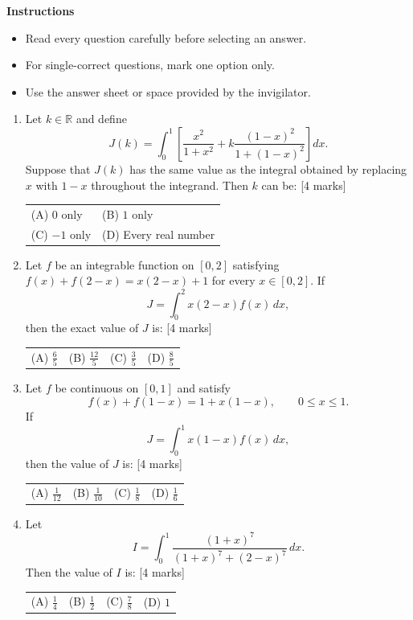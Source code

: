 \documentclass[11pt,a4paper]{article}
\begin{document}
\textbf{Instructions}
\begin{itemize}[topsep=2pt]
\item Read every question carefully before selecting an answer.
\item For single-correct questions, mark one option only.
\item Use the answer sheet or space provided by the invigilator.
\end{itemize}
\begin{enumerate}[resume]
\item Let \(k\in\mathbb{R}\) and define
\[
J(k)=\int_0^1\left[\frac{x^2}{1+x^2}+k\frac{(1-x)^2}{1+(1-x)^2}\right]dx.
\]
Suppose that \(J(k)\) has the same value as the integral obtained by replacing \(x\) with \(1-x\) throughout the integrand. Then \(k\) can be: \hfill [4 marks]
{\renewcommand{\arraystretch}{1.8}
\begin{tabularx}{\linewidth}{X X}
(A) \quad \(0\) only & (B) \quad \(1\) only \\[10pt]
(C) \quad \(-1\) only & (D) \quad Every real number \\[10pt]
\end{tabularx}}
\item Let $f$ be an integrable function on $[0,2]$ satisfying $f(x)+f(2-x)=x(2-x)+1$ for every $x\in[0,2]$. If
\[
J=\int_0^2 x(2-x)f(x)\,dx,
\]
then the exact value of $J$ is: \hfill [4 marks]
{\renewcommand{\arraystretch}{1.8}
\begin{tabularx}{\linewidth}{X X X X}
(A) \quad $\frac{6}{5}$ & (B) \quad $\frac{12}{5}$ & (C) \quad $\frac{3}{5}$ & (D) \quad $\frac{8}{5}$ \\[10pt]
\end{tabularx}}
\item Let $f$ be continuous on $[0,1]$ and satisfy
\[
f(x)+f(1-x)=1+x(1-x),\qquad 0\le x\le 1.
\]
If
\[
J=\int_0^1 x(1-x)f(x)\,dx,
\]
then the value of $J$ is: \hfill [4 marks]
{\renewcommand{\arraystretch}{1.8}
\begin{tabularx}{\linewidth}{X X X X}
(A) \quad $\frac{1}{12}$ & (B) \quad $\frac{1}{10}$ & (C) \quad $\frac{1}{8}$ & (D) \quad $\frac{1}{6}$ \\[10pt]
\end{tabularx}}
\item Let \[I=\int_{0}^{1}\frac{(1+x)^7}{(1+x)^7+(2-x)^7}\,dx.\] Then the value of $I$ is: \hfill [4 marks]
{\renewcommand{\arraystretch}{1.8}
\begin{tabularx}{\linewidth}{X X X X}
(A) \quad $\frac{1}{4}$ & (B) \quad $\frac{1}{2}$ & (C) \quad $\frac{7}{8}$ & (D) \quad $1$ \\[10pt]

\end{tabularx}}
\end{enumerate}
\end{document}
